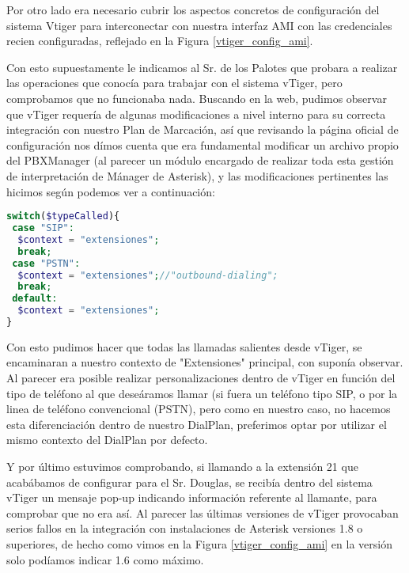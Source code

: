 
Por otro lado era necesario cubrir los aspectos concretos de configuración del sistema Vtiger para interconectar con nuestra interfaz AMI con las credenciales recien configuradas, reflejado en la Figura \ref{vtiger_config_ami}.


Con esto supuestamente le indicamos al Sr. de los Palotes que probara a realizar las operaciones que conocía para trabajar con el sistema vTiger, pero comprobamos que no funcionaba nada. Buscando en la web, pudimos observar que vTiger requería de algunas modificaciones a nivel interno para su correcta integración con nuestro Plan de Marcación, así que revisando la página oficial de configuración \cite{website:vtigerpbx} nos dímos cuenta que era fundamental modificar un archivo propio del PBXManager (al parecer un módulo encargado de realizar toda esta gestión de interpretación de Mánager de Asterisk), y las modificaciones pertinentes las hicimos según podemos ver a continuación:

\begin{lstlisting}[language=php,title={./www/vtigercrm/modules/PBXManager/utils/AsteriskClass.php}]
switch($typeCalled){
 case "SIP":
  $context = "extensiones";
  break;
 case "PSTN":
  $context = "extensiones";//"outbound-dialing";
  break;
 default:
  $context = "extensiones";
}
\end{lstlisting}

Con esto pudimos hacer que todas las llamadas salientes desde vTiger, se encaminaran a nuestro contexto de "Extensiones" principal, con suponía observar. Al parecer era posible realizar personalizaciones dentro de vTiger en función del tipo de teléfono al que deseáramos llamar (si fuera un teléfono tipo SIP, o por la linea de teléfono convencional (PSTN), pero como en nuestro caso, no hacemos esta diferenciación dentro de nuestro DialPlan, preferimos optar por utilizar el mismo contexto del DialPlan por defecto.

Y por último estuvimos comprobando, si llamando a la extensión 21 que acabábamos de configurar para el Sr. Douglas, se recibía dentro del sistema vTiger un mensaje pop-up indicando información referente al llamante, para comprobar que no era así. Al parecer las últimas versiones de vTiger provocaban serios fallos en la integración con instalaciones de Asterisk versiones 1.8 o superiores, de hecho como vimos en la Figura \ref{vtiger_config_ami} en la versión solo podíamos indicar 1.6 como máximo. 

